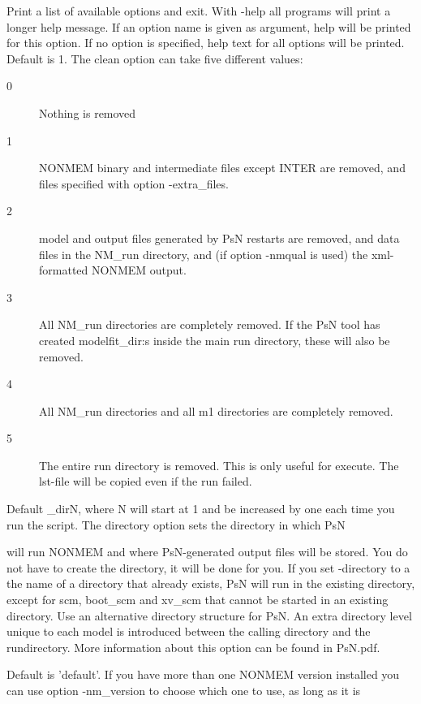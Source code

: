 \begin{optionlist}
Print a list of available options and exit. 
\nextopt
{}
With -help all programs will print a longer help message. If an option name is given as argument, help will be printed for this option. If no option is specified, help text for all options will be printed. 
\nextopt
{}
Default is 1. The clean option can take five different values:  
\begin{description}
	\item[0] Nothing is removed 
	\item[1] NONMEM binary and intermediate files except INTER are removed, and files specified with option -extra\_files. 
	\item[2] model and output files generated by PsN restarts are removed, and data files in the NM\_run directory, and (if option -nmqual is used) the xml-formatted NONMEM output. 
	\item[3] All NM\_run directories are completely removed. If the PsN tool has created modelfit\_dir:s inside the main run directory, these  will also be removed. 
	\item[4] All NM\_run directories and all m1 directories are completely removed.
    \item[5] The entire run directory is removed. This is only useful for execute. The lst-file will be copied even if the run failed.
\end{description}
\nextopt
{}

Default \guidetoolname\_dirN,
where N will start at 1 and be increased by one each time you run the script. The directory option sets the directory in which PsN 

will run NONMEM and where PsN-generated output files will be stored. You do not have to create the directory,  it will be done for you. If you set -directory to a the name of a directory that already exists, PsN will run in the existing directory, except for scm, boot\_scm and xv\_scm that cannot be started in an existing directory.
\nextopt
{}
	Use an alternative directory structure for PsN. An extra directory
    level unique to each model is introduced between the calling
    directory and the rundirectory. More information about this option can
    be found in PsN.pdf.
\nextopt
   
Default is 'default'. 
If you have more than one NONMEM version installed you can use option -nm\_version to choose which one to use, as long as it is 


\end{optionlist}
